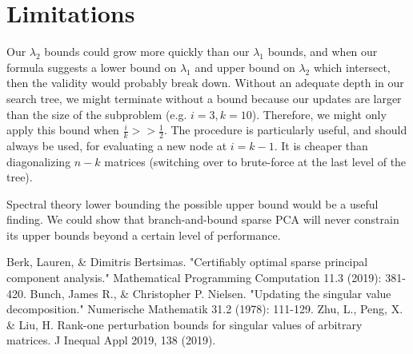 \documentclass{article}
\begin{document}
\section{Limitations}

Our $\lambda_2$ bounds could grow more quickly than our $\lambda_1$ bounds, and when our formula suggests a lower bound on $\lambda_1$ and upper bound on $\lambda_2$ which intersect, then the validity would probably break down. Without an adequate depth in our search tree, we might terminate without a bound because our updates are larger than the size of the subproblem (e.g. $i=3,k=10$). Therefore, we might only apply this bound when $\frac{i}{k} >> \frac{1}{2}$. The procedure is particularly useful, and should always be used, for evaluating a new node at $i=k-1$. It is cheaper than diagonalizing $n-k$ matrices (switching over to brute-force at the last level of the tree).

Spectral theory lower bounding the possible upper bound would be a useful finding. We could show that branch-and-bound sparse PCA will never constrain its upper bounds beyond a certain level of performance.

\begin{thebibliography}{9}
     Berk, Lauren, \& Dimitris Bertsimas. "Certifiably optimal sparse principal component analysis." Mathematical Programming Computation 11.3 (2019): 381-420.
     Bunch, James R., \& Christopher P. Nielsen. "Updating the singular value decomposition." Numerische Mathematik 31.2 (1978): 111-129.
     Zhu, L., Peng, X. \& Liu, H. Rank-one perturbation bounds for singular values of arbitrary matrices. J Inequal Appl 2019, 138 (2019).
\end{thebibliography}
\end{document}
